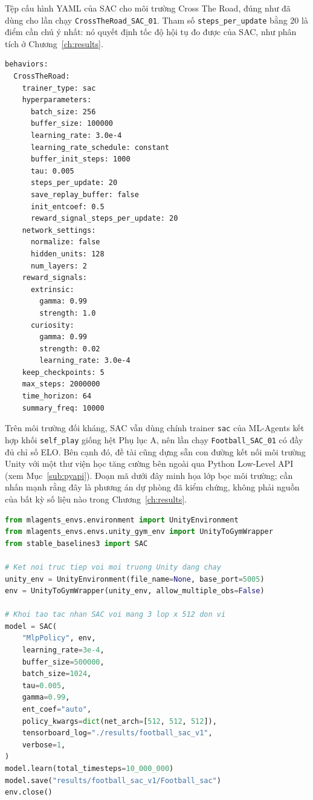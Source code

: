 Tệp cấu hình YAML của SAC cho môi trường Cross The Road, đúng như đã dùng cho lần chạy
\texttt{CrossTheRoad\_SAC\_01}. Tham số \texttt{steps\_per\_update} bằng $20$ là điểm cần chú
ý nhất: nó quyết định tốc độ hội tụ đo được của SAC, như phân tích ở
Chương~\ref{ch:results}.

\begin{lstlisting}[basicstyle=\ttfamily\scriptsize,caption={ctr\_sac.yaml},captionpos=b]
behaviors:
  CrossTheRoad:
    trainer_type: sac
    hyperparameters:
      batch_size: 256
      buffer_size: 100000
      learning_rate: 3.0e-4
      learning_rate_schedule: constant
      buffer_init_steps: 1000
      tau: 0.005
      steps_per_update: 20
      save_replay_buffer: false
      init_entcoef: 0.5
      reward_signal_steps_per_update: 20
    network_settings:
      normalize: false
      hidden_units: 128
      num_layers: 2
    reward_signals:
      extrinsic:
        gamma: 0.99
        strength: 1.0
      curiosity:
        gamma: 0.99
        strength: 0.02
        learning_rate: 3.0e-4
    keep_checkpoints: 5
    max_steps: 2000000
    time_horizon: 64
    summary_freq: 10000
\end{lstlisting}

Trên môi trường đối kháng, SAC vẫn dùng chính trainer \texttt{sac} của ML-Agents kết hợp
khối \texttt{self\_play} giống hệt Phụ lục A, nên lần chạy \texttt{Football\_SAC\_01} có
đầy đủ chỉ số ELO. Bên cạnh đó, đề tài cũng dựng sẵn con đường kết nối môi trường Unity
với một thư viện học tăng cường bên ngoài qua Python Low-Level API (xem
Mục~\ref{sub:pyapi}). Đoạn mã dưới đây minh họa lớp bọc môi trường; cần nhấn mạnh rằng
đây là phương án dự phòng đã kiểm chứng, không phải nguồn của bất kỳ số liệu nào trong
Chương~\ref{ch:results}.

\begin{lstlisting}[language=Python,caption={Kết nối môi trường Unity với mlagents\_envs + Stable-Baselines3},captionpos=b]
from mlagents_envs.environment import UnityEnvironment
from mlagents_envs.envs.unity_gym_env import UnityToGymWrapper
from stable_baselines3 import SAC

# Ket noi truc tiep voi moi truong Unity dang chay
unity_env = UnityEnvironment(file_name=None, base_port=5005)
env = UnityToGymWrapper(unity_env, allow_multiple_obs=False)

# Khoi tao tac nhan SAC voi mang 3 lop x 512 don vi
model = SAC(
    "MlpPolicy", env,
    learning_rate=3e-4,
    buffer_size=500000,
    batch_size=1024,
    tau=0.005,
    gamma=0.99,
    ent_coef="auto",
    policy_kwargs=dict(net_arch=[512, 512, 512]),
    tensorboard_log="./results/football_sac_v1",
    verbose=1,
)
model.learn(total_timesteps=10_000_000)
model.save("results/football_sac_v1/Football_sac")
env.close()
\end{lstlisting}

